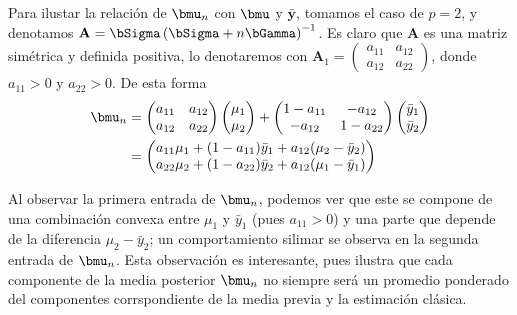 \documentclass[10pt,openright]{book}\usepackage[]{graphicx}\usepackage[]{color}
\begin{document}
Para ilustar la relaci\'on de $\bmu_n$ con $\bmu$ y $\bar{\mathbf{y}}$, tomamos el caso de $p=2$, y denotamos $\mathbf{A}=\bSigma\left(\bSigma+n\bGamma\right)^{-1}$. Es claro que $\mathbf{A}$ es una matriz sim\'etrica y definida positiva, lo denotaremos con $\mathbf{A}_1=\begin{pmatrix}a_{11}&a_{12}\\ a_{12}&a_{22}\end{pmatrix}$, donde $a_{11}>0$ y $a_{22}>0$. De esta forma
\begin{align*}
\bmu_n&=\begin{pmatrix}a_{11}&a_{12}\\ a_{12}&a_{22}\end{pmatrix}\begin{pmatrix}\mu_{1}\\ \mu_{2}\end{pmatrix}+\begin{pmatrix}1-a_{11}&-a_{12}\\ -a_{12}&1-a_{22}\end{pmatrix}\begin{pmatrix}\bar{y}_{1}\\ \bar{y}_{2}\end{pmatrix}\\
&=\begin{pmatrix}a_{11}\mu_1+(1-a_{11})\bar{y}_{1}+a_{12}(\mu_2-\bar{y}_{2})\\a_{22}\mu_2+(1-a_{22})\bar{y}_{2}+a_{12}(\mu_1-\bar{y}_{1})\end{pmatrix}
\end{align*}

Al observar la primera entrada de $\bmu_n$, podemos ver que este se compone de una combinaci\'on convexa entre $\mu_1$ y $\bar{y}_1$ (pues $a_{11}>0$) y una parte que depende de la diferencia $\mu_2-\bar{y}_{2}$; un comportamiento silimar se observa en la segunda entrada de $\bmu_n$. Esta observaci\'on es interesante, pues ilustra que cada componente de la media posterior $\bmu_n$ no siempre ser\'a un promedio ponderado del componentes corrspondiente de la media previa y la estimaci\'on cl\'asica.
\end{document}
